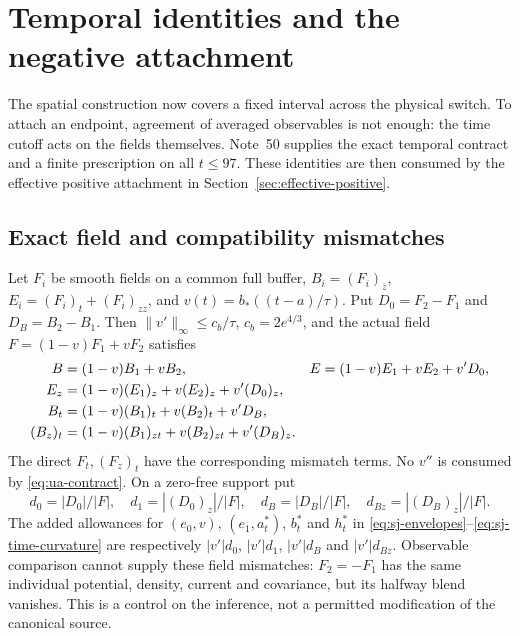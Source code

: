 \section{Temporal identities and the negative attachment}\label{sec:temporal-cover}
The spatial construction now covers a fixed interval across the physical
switch. To attach an endpoint, agreement of averaged observables is not
enough: the time cutoff acts on the fields themselves. Note~50
\cite{n50} supplies the exact temporal contract and a finite prescription
on all $t\le97$. These identities are then consumed by the effective
positive attachment in Section~\ref{sec:effective-positive}.

\subsection{Exact field and compatibility mismatches}
Let $F_i$ be smooth fields on a common full buffer,
$B_i=(F_i)_{\bar z}$, $E_i=(F_i)_t+(F_i)_{zz}$, and
$v(t)=b_*((t-a)/\tau)$. Put $D_0=F_2-F_1$ and $D_B=B_2-B_1$.
Then $\|v'\|_\infty\le c_b/\tau$, $c_b=2e^{4/3}$, and the
actual field $F=(1-v)F_1+vF_2$ satisfies
\begin{align}
 B&=(1-v)B_1+vB_2,&
 E&=(1-v)E_1+vE_2+v'D_0,\notag\\
 E_z&=(1-v)(E_1)_z+v(E_2)_z+v'(D_0)_z,\notag\\
 B_t&=(1-v)(B_1)_t+v(B_2)_t+v'D_B,\notag\\
 (B_z)_t&=(1-v)(B_1)_{zt}+v(B_2)_{zt}+v'(D_B)_z.
 \label{eq:tc-exact}
\end{align}
The direct $F_t,(F_z)_t$ have the corresponding mismatch terms.
No $v''$ is consumed by \eqref{eq:ua-contract}. On a zero-free
support put
\[
 d_0=|D_0|/|F|,\quad d_1=|(D_0)_z|/|F|,\quad
 d_B=|D_B|/|F|,\quad d_{Bz}=|(D_B)_z|/|F|.
\]
The added allowances for $(e_0,v)$, $(e_1,a_t^*)$, $b_t^*$ and
$h_t^*$ in \eqref{eq:sj-envelopes}--\eqref{eq:sj-time-curvature}
are respectively $|v'|d_0$, $|v'|d_1$, $|v'|d_B$ and $|v'|d_{Bz}$.
Observable comparison cannot supply these field mismatches: $F_2=-F_1$
has the same individual potential, density, current and covariance,
but its halfway blend vanishes. This is a control on the inference,
not a permitted modification of the canonical source.

